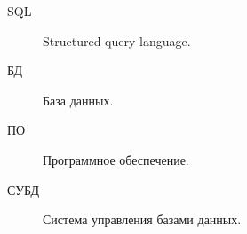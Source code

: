 \Abbreviations %
\begin{description}
\item[SQL] Structured query language.
\item[БД] База данных.
\item[ПО] Программное обеспечение.
\item[СУБД] Система управления базами данных.

\end{description}

